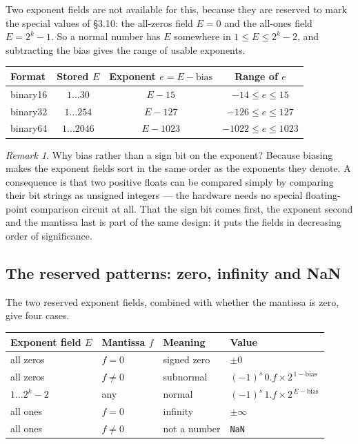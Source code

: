 \documentclass[11pt]{article}
\theoremstyle{plain}
\theoremstyle{definition}
\theoremstyle{remark}
\newtheorem*{rmk}{Remark}
\begin{document}
Two exponent fields are not available for this, because they are reserved to
mark the special values of \S3.10: the all-zeros field $E=0$ and the all-ones
field $E=2^{k}-1$. So a normal number has $E$ somewhere in
$1\le E\le 2^{k}-2$, and subtracting the bias gives the range of usable
exponents.

\begin{center}
\renewcommand{\arraystretch}{1.3}
\begin{tabular}{@{}l c c c@{}}
\toprule
\textbf{Format} & \textbf{Stored $E$} & \textbf{Exponent $e=E-\text{bias}$}
                & \textbf{Range of $e$} \\
\midrule
binary16 & $1\ldots30$   & $E-15$   & $-14 \le e \le 15$ \\
binary32 & $1\ldots254$  & $E-127$  & $-126 \le e \le 127$ \\
binary64 & $1\ldots2046$ & $E-1023$ & $-1022 \le e \le 1023$ \\
\bottomrule
\end{tabular}
\end{center}

\begin{rmk}
Why bias rather than a sign bit on the exponent? Because biasing makes the
exponent fields sort in the same order as the exponents they denote. A
consequence is that two positive floats can be compared simply by comparing
their bit strings as unsigned integers --- the hardware needs no special
floating-point comparison circuit at all. That the sign bit comes first, the
exponent second and the mantissa last is part of the same design: it puts the
fields in decreasing order of significance.
\end{rmk}

\subsection{The reserved patterns: zero, infinity and NaN}
The two reserved exponent fields, combined with whether the mantissa is zero,
give four cases.

\begin{center}
\renewcommand{\arraystretch}{1.35}
\begin{tabular}{@{}l l l l@{}}
\toprule
\textbf{Exponent field $E$} & \textbf{Mantissa $f$} & \textbf{Meaning}
  & \textbf{Value} \\
\midrule
all zeros & $f=0$    & signed zero  & $\pm 0$ \\
all zeros & $f\neq0$ & subnormal    & $(-1)^{s}\,0.f\times2^{\,1-\text{bias}}$ \\
$1\ldots2^{k}-2$ & any & normal     & $(-1)^{s}\,1.f\times2^{\,E-\text{bias}}$ \\
all ones  & $f=0$    & infinity     & $\pm\infty$ \\
all ones  & $f\neq0$ & not a number & \texttt{NaN} \\
\bottomrule
\end{tabular}
\end{center}
\end{document}
